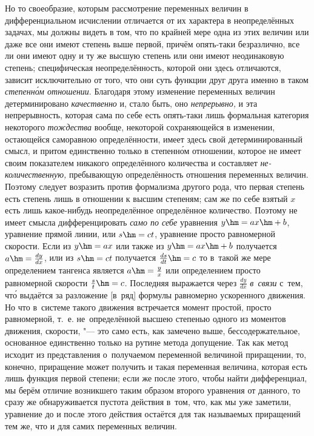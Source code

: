 \label{bkm:bm53c}Но то своеобразие, которым рассмотрение переменных величин в
дифференциальном исчислении отличается от их характера в неопределённых
задачах, мы должны видеть в том, что по крайней мере одна из этих величин или
даже все они имеют степень выше первой, причём опять-таки безразлично, все ли
они имеют одну и ту же высшую степень или они имеют неодинаковую степень;
специфическая неопределённость, которой они здесь отличаются, зависит
исключительно от того, что они суть функции друг друга именно в таком
{\em степенн\'{о}м отношении}. Благодаря этому изменение переменных величин
детерминировано {\em качественно} и, стало быть, оно {\em непрерывно,} и эта
непрерывность, которая сама по себе есть опять-таки лишь формальная категория
некоторого {\em тождества} вообще, некоторой сохраняющейся в изменении,
остающейся саморавною определённости, имеет здесь свой детерминированный смысл,
и притом единственно только в степенн\'{о}м отношении, которое не имеет своим
показателем никакого определённого количества и составляет
{\em не-количественную,} пребывающую определённость отношения переменных
величин. Поэтому следует возразить против формализма другого рода, что первая
степень есть степень лишь в отношении к высшим степеням; сам же по себе взятый
$x$ есть лишь какое-нибудь неопределённое определённое количество. Поэтому
не имеет смысла дифференцировать {\em само по себе} уравнения $y\hm=ax\hm+b$,
уравнение прямой линии, или $s\hm=ct$, уравнение просто равномерной скорости.
Если из $y\hm=ax$ или также из $y\hm=ax\hm+b$ получается $a\hm=\frac{dy}{dx}$,
или из $s\hm=ct$ получается $\frac{ds}{dt}\hm=c$ то в~такой же мере
определением тангенса является $a\hm=\frac y x$ или определением просто
равномерной скорости $\frac s t\hm=c$. Последняя выражается через
$\frac{dy}{dx}$ {\em в~связи} с~тем, чт\'{о} выдаётся за разложение [в~ряд]
формулы равномерно ускоренного движения. Но что в~системе такого движения
встречается момент простой, просто равномерной, т.~е. не~определённой высшею
степенью одного из моментов движения, скорости, "--- это само есть, как
замечено выше, бессодержательное, основанное единственно только на рутине
метода допущение. Так как метод исходит из представления о~получаемом
переменной величиной приращении, то, конечно, приращение может получить и такая
переменная величина, которая есть лишь функция первой степени; если же после
этого, чтобы найти дифференциал, мы берём отличие возникшего таким образом
второго уравнения от данного, то сразу же обнаруживается пустота действия
в~том, что, как мы уже заметили, уравнение до и после этого действия остаётся
для так называемых приращений тем же, что и для самих переменных величин.


